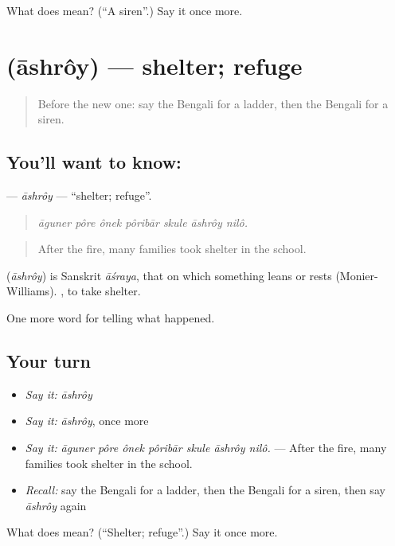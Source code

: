 \begin{tcolorbox}[breakable,colback=teal!4,colframe=teal!35!black,title={Before you move on}]
What does  mean? (\textquotedblleft{}A siren\textquotedblright{}.) Say it once more.
\end{tcolorbox}
\section[\texorpdfstring{\bn{আশ্রয়} (āshrôy)}{আশ্রয় (āshrôy)}]{ (āshrôy) — shelter; refuge}

\label{lesson:BN-C280-ashroy}



\begin{quote}
Before the new one: say the Bengali for a ladder, then the Bengali for a siren.
\end{quote}

\subsection*{You'll want to know: }
\textbf{} — \emph{āshrôy} — \textquotedblleft{}shelter; refuge\textquotedblright{}.

\begin{quote}
      
\end{quote}

\begin{quote}
\emph{āguner pôre ônek pôribār skule āshrôy nilô.}
\end{quote}

\begin{quote}
After the fire, many families took shelter in the school.
\end{quote}

\begin{cousinweb}
\textbf{} (\emph{āshrôy}) is Sanskrit \emph{āśraya}, that on which something leans or rests (Monier-Williams).  , to take shelter.
\end{cousinweb}

\begin{grammarlens}[title={What you've built}]
One more word for telling what happened.
\end{grammarlens}

\subsection*{Your turn}
\begin{itemize}
\raggedright
  \item \emph{Say it:} \emph{āshrôy}
  \item \emph{Say it:} \emph{āshrôy}, once more
  \item \emph{Say it:} \emph{āguner pôre ônek pôribār skule āshrôy nilô.} — After the fire, many families took shelter in the school.
  \item \emph{Recall:} say the Bengali for a ladder, then the Bengali for a siren, then say \emph{āshrôy} again
\end{itemize}

\begin{tcolorbox}[breakable,colback=teal!4,colframe=teal!35!black,title={Before you move on}]
What does  mean? (\textquotedblleft{}Shelter; refuge\textquotedblright{}.) Say it once more.
\end{tcolorbox}
